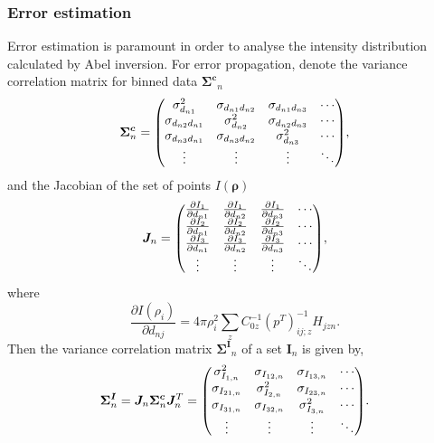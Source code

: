 \documentclass[12pt]{article}
\begin{document}
\subsubsection{Error estimation}
Error estimation is paramount in order to analyse the intensity distribution calculated by Abel inversion. For error propagation, denote the variance correlation matrix for binned data $\bm{\Sigma^c}_n$
\begin{equation*}
    \bm{\Sigma^c}_n=\mqty(\sigma_{d_{n1}}^2 & \sigma_{d_{n1}d_{n2}} & \sigma_{d_{n1}d_{n3}} & \cdots\\
                     \sigma_{d_{n2}d_{n1}} & \sigma_{d_{n2}}^2 & \sigma_{d_{n2}d_{n3}} & \cdots\\
                     \sigma_{d_{n3}d_{n1}} & \sigma_{d_{n3}d_{n2}} & \sigma_{d_{n3}}^2 & \cdots\\
                     \vdots & \vdots & \vdots & \ddots),
\end{equation*}
and the Jacobian of the set of points $I(\bm{\rho})$
\begin{equation*}
    \bm{J}_n=\mqty(\frac{\partial I_{1}}{\partial d_{n1}} & \frac{\partial I_{1}}{\partial d_{n2}} & \frac{\partial I_{1}}{\partial d_{n3}} & \cdots \\
    \frac{\partial I_{2}}{\partial d_{n1}} & \frac{\partial I_{2}}{\partial d_{n2}} & \frac{\partial I_{2}}{\partial d_{n3}} & \cdots \\
    \frac{\partial I_{3}}{\partial d_{n1}} & \frac{\partial I_{3}}{\partial d_{n2}} & \frac{\partial I_{3}}{\partial d_{n3}} & \cdots \\
    \vdots & \vdots & \vdots & \ddots ),
\end{equation*}
where
\begin{equation*}
    \frac{\partial I(\rho_{i})}{\partial d_{nj}} = 4\pi\rho_i^2\sum_{z}C^{-1}_{0z}\left(p^T\right)_{ij;z}^{-1}H_{jzn}.
\end{equation*}
Then the variance correlation matrix $\bm{\Sigma^I}_n$ of a set $\bm{I}_n$ is given by,
\begin{equation*}
    \bm{\Sigma^I}_n=\bm{J}_n\bm{\Sigma^c}_n\bm{J}_n^T=\mqty(\sigma_{I_{1,n}}^2 & \sigma_{I_{12,n}} & \sigma_{I_{13,n}} & \cdots\\
                     \sigma_{I_{21,n}} & \sigma_{I_{2,n}}^2 & \sigma_{I_{23,n}} & \cdots\\
                     \sigma_{I_{31,n}} & \sigma_{I_{32,n}} & \sigma_{I_{3,n}}^2 & \cdots\\
                     \vdots & \vdots & \vdots & \ddots).
\end{equation*}
\end{document}
